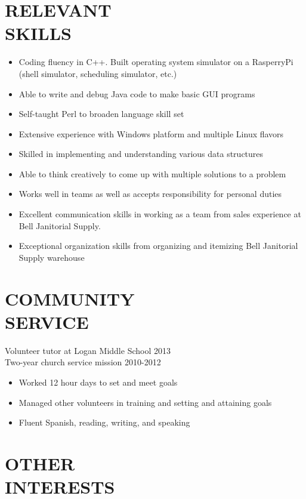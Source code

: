 \documentclass[line,margin]{res}
\begin{document}
\begin{resume}
\begin{itemize}
	\section{RELEVANT\\SKILLS}
	\begin{itemize}
		\item Coding fluency in C++. Built operating system simulator on
		      a RasperryPi (shell simulator, scheduling simulator, etc.)
		\item Able to write and debug Java code to make basic GUI programs
		\item Self-taught Perl to broaden language skill set
		\item Extensive experience with Windows platform and multiple Linux flavors
		\item Skilled in implementing and understanding various data structures
		\item Able to think creatively to come up with multiple solutions to a problem
		\item Works well in teams as well as accepts responsibility for personal duties
		\item Excellent communication skills in working as a team from sales experience
		      at Bell Janitorial Supply.
		\item Exceptional organization skills from organizing and itemizing Bell 								Janitorial Supply warehouse
	\end{itemize}

	\section{COMMUNITY \\ SERVICE}

	Volunteer tutor at Logan Middle School \hfill 2013
	\\Two-year church service mission \hfill 2010-2012
	\begin{itemize} \itemsep -2pt %
		\item Worked 12 hour days to set and meet goals
		\item Managed other volunteers in training and setting and attaining goals
		\item Fluent Spanish, reading, writing, and speaking
	\end{itemize}

	\section{OTHER \\ INTERESTS}


\end{itemize}
\end{resume}
\end{document}
